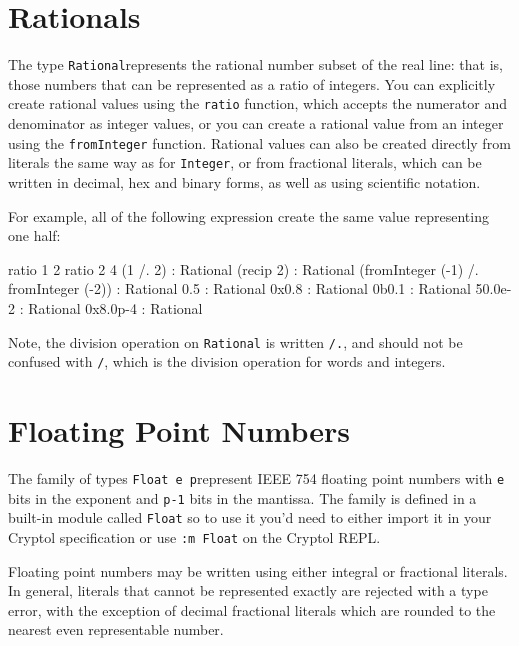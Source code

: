 \section{Rationals}
\label{sec:rational}

The type \texttt{Rational}\indTheRationalType represents the rational number subset
of the real line: that is, those numbers that can be represented
as a ratio of integers. You can explicitly create rational values using
the \texttt{ratio} function, which accepts the numerator and denominator
as integer values, or you can create a rational value from an
integer using the \texttt{fromInteger} function.  Rational values can
also be created directly from literals the same way as for
\texttt{Integer}, or from fractional literals, which can be written
in decimal, hex and binary forms, as well as using scientific notation.

For example, all of the following expression create the same
value representing one half:
\restartrepl
\begin{replinVerb}
  ratio 1 2
  ratio 2 4
  (1 /. 2) : Rational
  (recip 2) : Rational
  (fromInteger (-1) /. fromInteger (-2)) : Rational
  0.5 : Rational
  0x0.8 : Rational
  0b0.1 : Rational
  50.0e-2 : Rational
  0x8.0p-4 : Rational
\end{replinVerb}
\restartrepl

Note, the division operation on \texttt{Rational} is
written \texttt{/.}, and should not be confused with
\texttt{/}, which is the division operation for words
and integers.


\section{Floating Point Numbers}
\label{sec:floats}

The family of types \texttt{Float e p}\indTheFloatType represent IEEE 754
floating point numbers with \texttt{e} bits in the exponent and
\texttt{p-1} bits in the mantissa.  The family is defined in a built-in
module called \texttt{Float} so to use it you'd need to either import
it in your Cryptol specification or use \texttt{:m Float} on the
Cryptol REPL.

Floating point numbers may be written using either integral or fractional
literals.  In general, literals that cannot be represented exactly are
rejected with a type error, with the exception of decimal fractional literals
which are rounded to the nearest even representable number.

